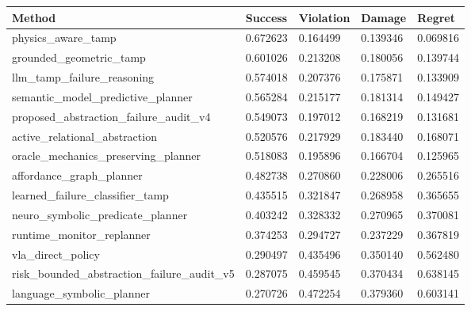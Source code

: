 \begin{tabular}{lllll}
\toprule
Method & Success & Violation & Damage & Regret \\
\midrule
physics\_aware\_tamp & 0.672623 & 0.164499 & 0.139346 & 0.069816 \\
grounded\_geometric\_tamp & 0.601026 & 0.213208 & 0.180056 & 0.139744 \\
llm\_tamp\_failure\_reasoning & 0.574018 & 0.207376 & 0.175871 & 0.133909 \\
semantic\_model\_predictive\_planner & 0.565284 & 0.215177 & 0.181314 & 0.149427 \\
proposed\_abstraction\_failure\_audit\_v4 & 0.549073 & 0.197012 & 0.168219 & 0.131681 \\
active\_relational\_abstraction & 0.520576 & 0.217929 & 0.183440 & 0.168071 \\
oracle\_mechanics\_preserving\_planner & 0.518083 & 0.195896 & 0.166704 & 0.125965 \\
affordance\_graph\_planner & 0.482738 & 0.270860 & 0.228006 & 0.265516 \\
learned\_failure\_classifier\_tamp & 0.435515 & 0.321847 & 0.268958 & 0.365655 \\
neuro\_symbolic\_predicate\_planner & 0.403242 & 0.328332 & 0.270965 & 0.370081 \\
runtime\_monitor\_replanner & 0.374253 & 0.294727 & 0.237229 & 0.367819 \\
vla\_direct\_policy & 0.290497 & 0.435496 & 0.350140 & 0.562480 \\
risk\_bounded\_abstraction\_failure\_audit\_v5 & 0.287075 & 0.459545 & 0.370434 & 0.638145 \\
language\_symbolic\_planner & 0.270726 & 0.472254 & 0.379360 & 0.603141 \\
\bottomrule
\end{tabular}
